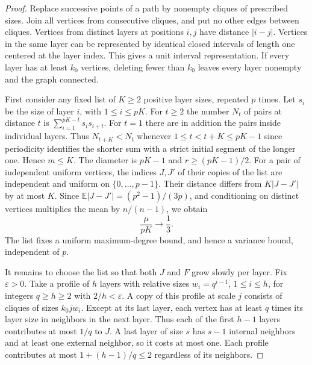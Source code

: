 \documentclass[11pt,a4paper]{article}
\theoremstyle{remark}\newtheorem*{remark}{Remark}
\begin{document}
\begin{proof}
Replace successive points of a path by nonempty cliques of prescribed
sizes. Join all vertices from consecutive cliques, and put no other
edges between cliques. Vertices from distinct layers at positions $i,j$
have distance $|i-j|$. Vertices in the same layer can be represented by
identical closed intervals of length one centered at the layer index.
This gives a unit interval representation. If every layer has at least
$k_0$ vertices, deleting fewer than $k_0$ leaves every layer nonempty
and the graph connected.

First consider any fixed list of $K\ge2$ positive layer sizes, repeated
$p$ times. Let $s_i$ be the size of layer $i$, with $1\le i\le pK$.
For $t\ge2$ the number $N_t$ of pairs at distance $t$ is
$\sum_{i=1}^{pK-t}s_i s_{i+t}$. For $t=1$ there are in addition the
pairs inside individual layers. Thus $N_{t+K}<N_t$ whenever
$1\le t<t+K\le pK-1$ since periodicity identifies the shorter sum
with a strict initial segment of the longer one. Hence $m\le K$.
The diameter is $pK-1$ and $r\ge(pK-1)/2$. For a pair of independent
uniform vertices, the indices $J,J'$ of their copies of the list are
independent and uniform on $\{0,\ldots,p-1\}$. Their distance differs
from $K|J-J'|$ by at most $K$. Since
$\mathbb E|J-J'|=(p^2-1)/(3p)$, and conditioning on distinct vertices
multiplies the mean by $n/(n-1)$, we obtain
\begin{equation}\label{eq:syn-chain-scale}
 \frac{\mu}{pK}\longrightarrow\frac13.
\end{equation}
The list fixes a uniform maximum-degree bound, and hence a variance
bound, independent of $p$.

It remains to choose the list so that both $J$ and $F$ grow slowly per
layer. Fix $\varepsilon>0$. Take a profile of $h$ layers with relative
sizes $w_i=q^{i-1}$, $1\le i\le h$, for integers $q\ge h\ge2$ with
$2/h<\varepsilon$. A copy of this profile at scale $j$ consists of
cliques of sizes $k_0 j w_i$. Except at its last layer, each vertex has
at least $q$ times its layer size in neighbors in the next layer. Thus
each of the first $h-1$ layers contributes at most $1/q$ to $J$. A
last layer of size $s$ has $s-1$ internal neighbors and at least one
external neighbor, so it costs at most one. Each profile contributes
at most $1+(h-1)/q\le2$ regardless of its neighbors.


\end{proof}
\end{document}
